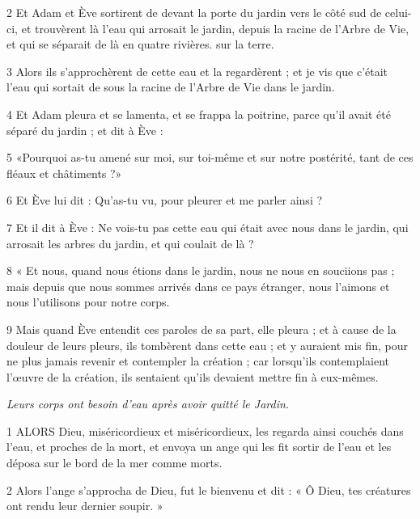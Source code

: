 \par 2 Et Adam et Ève sortirent de devant la porte du jardin vers le côté sud de celui-ci, et trouvèrent là l'eau qui arrosait le jardin, depuis la racine de l'Arbre de Vie, et qui se séparait de là en quatre rivières. sur la terre.

\par 3 Alors ils s'approchèrent de cette eau et la regardèrent ; et je vis que c'était l'eau qui sortait de sous la racine de l'Arbre de Vie dans le jardin.

\par 4 Et Adam pleura et se lamenta, et se frappa la poitrine, parce qu'il avait été séparé du jardin ; et dit à Ève :

\par 5 «Pourquoi as-tu amené sur moi, sur toi-même et sur notre postérité, tant de ces fléaux et châtiments ?»

\par 6 Et Ève lui dit : Qu'as-tu vu, pour pleurer et me parler ainsi ?

\par 7 Et il dit à Ève : Ne vois-tu pas cette eau qui était avec nous dans le jardin, qui arrosait les arbres du jardin, et qui coulait de là ?

\par 8 « Et nous, quand nous étions dans le jardin, nous ne nous en souciions pas ; mais depuis que nous sommes arrivés dans ce pays étranger, nous l’aimons et nous l’utilisons pour notre corps.

\par 9 Mais quand Ève entendit ces paroles de sa part, elle pleura ; et à cause de la douleur de leurs pleurs, ils tombèrent dans cette eau ; et y auraient mis fin, pour ne plus jamais revenir et contempler la création ; car lorsqu'ils contemplaient l'œuvre de la création, ils sentaient qu'ils devaient mettre fin à eux-mêmes.


\par \textit{Leurs corps ont besoin d'eau après avoir quitté le Jardin.}

\par 1 ALORS Dieu, miséricordieux et miséricordieux, les regarda ainsi couchés dans l'eau, et proches de la mort, et envoya un ange qui les fit sortir de l'eau et les déposa sur le bord de la mer comme morts.

\par 2 Alors l'ange s'approcha de Dieu, fut le bienvenu et dit : « Ô Dieu, tes créatures ont rendu leur dernier soupir. »

